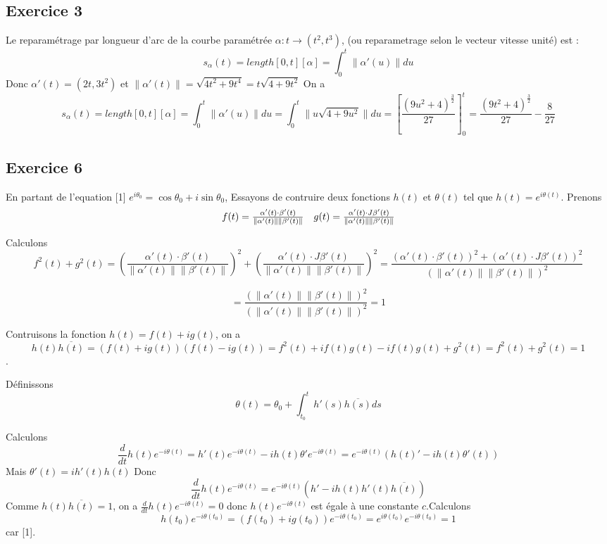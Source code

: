 \documentclass[]{book}
\theoremstyle{definition}
\begin{document}
\subsection*{Exercice 3}
Le reparam\'etrage par longueur d'arc de la courbe param\'etr\'ee $\alpha : t \to (t^2, t^3)$, (ou reparametrage selon le vecteur vitesse unit\'e) est :
$$
s_{\alpha}(t) = length[0,t][\alpha] = \int_0^t \lVert \alpha'(u) \rVert du
$$ 
Donc $\alpha'(t) = (2t, 3t^2)$ et $\lVert \alpha'(t) \rVert = \sqrt{4t^2+9t^4} = t\sqrt{4+9t^2}$
On a
$$
s_{\alpha}(t) = length[0,t][\alpha] = \int_0^t \lVert \alpha'(u) \rVert du = \int_0^t \lVert u\sqrt{4+9u^2} \rVert du = \left[ \frac{(9u^2+4)^{\frac{3}{2}}}{27}\right]_0^t = \frac{(9t^2+4)^{\frac{3}{2}}}{27} - \frac{8}{27}
$$


\subsection*{Exercice 6}
En partant de l'equation [1] $e^{i\theta_0} = \cos \theta_0 + i \sin \theta_0$, Essayons de contruire deux fonctions $h(t)$ et $\theta(t)$ tel que $h(t) = e^{i\theta(t)}$. 
Prenons
$$
\begin{array}{l l}
f(t) = \frac{\alpha'(t) \cdot \beta'(t)}{\lVert \alpha'(t) \rVert \lVert \beta'(t) \lVert} & g(t) = \frac{\alpha'(t) \cdot J\beta'(t)}{\lVert \alpha'(t) \rVert \lVert \beta'(t) \lVert}
\end{array}
$$

Calculons 
$$
f^2(t) + g^2(t) = \left( \frac{\alpha'(t) \cdot \beta'(t)}{\lVert \alpha'(t) \rVert \lVert \beta'(t) \lVert} \right)^2 + \left( \frac{\alpha'(t) \cdot J\beta'(t)}{\lVert \alpha'(t) \rVert \lVert \beta'(t) \lVert} \right)^2 = \frac{\left( \alpha'(t) \cdot \beta'(t)\right)^2 + \left( \alpha'(t) \cdot J\beta'(t)\right)^2 }{\left( \lVert \alpha'(t) \rVert \lVert \beta'(t) \lVert \right)^2}
$$ 

$$
= \frac{\left( \lVert \alpha'(t) \rVert \lVert \beta'(t) \lVert \right)^2}{\left( \lVert \alpha'(t) \rVert \lVert \beta'(t) \lVert \right)^2} = 1
$$

Contruisons la fonction $h(t) = f(t) + ig(t)$, on a 
$$h(t)\overline{h(t)} = (f(t) + ig(t))(f(t)-ig(t)) = f^2(t) + if(t)g(t) - if(t)g(t) + g^2(t) = f^2(t) + g^2(t) = 1$$.

D\'efinissons
$$
\theta(t) = \theta_0 + \int_{t_0}^th'(s)\overline{h(s)}ds
$$

Calculons 
$$\frac{d}{dt}h(t)e^{-i\theta(t)} = h'(t)e^{-i\theta(t)} - ih(t)\theta'e^{-i\theta(t)} = e^{-i\theta(t)}(h(t)'-ih(t)\theta'(t))$$
Mais $\theta'(t) = ih'(t)h(t)$
Donc
$$\frac{d}{dt}h(t)e^{-i\theta(t)} = e^{-i\theta(t)}(h'-ih(t)h'(t)\overline{h(t)})$$
Comme $h(t)\overline{h(t)} = 1$, on a $\frac{d}{dt}h(t)e^{-i\theta(t)} = 0$ donc $h(t)e^{-i\theta(t)}$ est \'egale \`a une constante $c$.Calculons
$$
h(t_0)e^{-i\theta(t_0)} = (f(t_0) + ig(t_0))e^{-i\theta(t_0)} = e^{i\theta(t_0)}e^{-i\theta(t_0)} = 1
$$
car [1].
\end{document}
